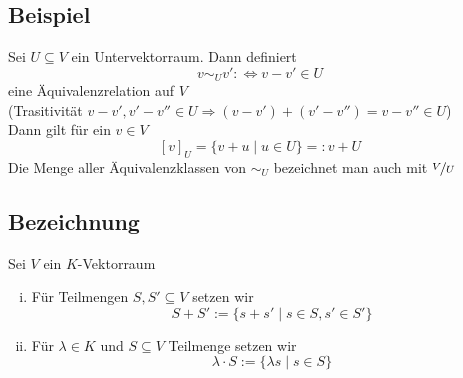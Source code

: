 \subsection{Beispiel} %
\label{sub:beispiel}
Sei $U \subseteq V$ ein Untervektorraum. Dann definiert
\[
	v \sim_U v' :\Leftrightarrow v-v' \in U
\]
eine Äquivalenzrelation auf $V$ \\
{\small (Trasitivität $v-v' , v' -v'' \in U \Rightarrow (v-v')+(v'-v'')=v-v'' \in U$)}
\vspace{10pt} \\
Dann gilt für ein $v \in V$
\[
	[v]_U = \{ v+u \mid u \in U \}=: v+U
\]
Die Menge aller Äquivalenzklassen von $\sim_U$ bezeichnet man auch mit $\nicefrac{V}{U}$

\subsection{Bezeichnung} %
\label{sub:bezeichnung}
Sei $V$ ein \(K\)-Vektorraum
\begin{enumerate}[(i)]
	\item Für Teilmengen $S,S' \subseteq V$ setzen wir
	\[
		S+S' := \{ s+s' \mid s \in S , s' \in S' \}
	\]
	\item Für $\lambda \in K$ und $S \subseteq V$ Teilmenge setzen wir
	\[
		\lambda \cdot S := \{ \lambda s \mid s \in S \}
	\]
\end{enumerate}

